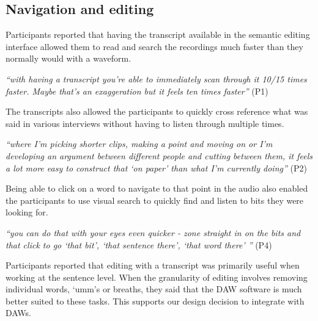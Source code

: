


\subsection{Navigation and editing}
Participants reported that having the transcript available in the semantic editing interface allowed them to read and
search the recordings much faster than they normally would with a waveform.

\textit{``with having a transcript you're able to immediately scan through it 10/15 times faster. Maybe that's an
  exaggeration but it feels ten times faster''} (P1)

The transcripts also allowed the participants to quickly cross reference what was said in various interviews without
having to listen through multiple times.

\textit{``where I'm picking shorter clips, making a point and moving on or I'm developing an argument between different
  people and cutting between them, it feels a lot more easy to construct that `on paper' than what I'm currently
  doing''} (P2)


Being able to click on a word to navigate to that point in the audio also enabled the participants to use visual search
to quickly find and listen to bits they were looking for.

\textit{``you can do that with your eyes even quicker - zone straight in on the bits and that click to go  `that bit',
  `that sentence there', `that word there' ''} (P4)

Participants reported that editing with a transcript was primarily useful when working at the sentence level. When the
granularity of editing involves removing individual words, `umm's or breaths, they said that the DAW software is much
better suited to these tasks. This supports our design decision to integrate with DAWs.

